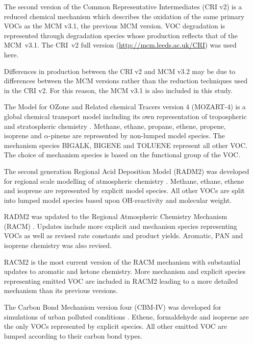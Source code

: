 The second version of the Common Representative Intermediates (CRI v2) \citep{Jenkin:2008} is a reduced chemical mechanism which describes the oxidation of the same primary VOCs as the MCM v3.1, the previous MCM version. 
VOC degradation is represented through degradation species whose  production reflects that of the \mbox{MCM v3.1}. 
The \mbox{CRI v2} full version (\url{http://mcm.leeds.ac.uk/CRI}) was used here.

Differences in  production between the CRI v2 and MCM v3.2 may be due to differences between the MCM versions rather than the reduction techniques used in the CRI v2. 
For this reason, the MCM v3.1 is also included in this study.

The Model for OZone and Related chemical Tracers version 4 (MOZART-4) is a global chemical transport model including its own representation of tropospheric and stratospheric chemistry \citep{Emmons:2010}. 
Methane, ethane, propane, ethene, propene, isoprene and $\alpha$-pinene are represented by non-lumped model species. 
The mechanism species BIGALK, BIGENE and TOLUENE represent all other VOC. 
The choice of mechanism species is based on the functional group of the VOC.

The second generation Regional Acid Deposition Model (RADM2) was developed for regional scale modelling of atmospheric chemistry \citep{Stockwell:1990}. 
Methane, ethane, ethene and isoprene are represented by explicit model species. 
All other VOCs are split into lumped model species based upon OH-reactivity and molecular weight.

RADM2 was updated to the Regional Atmospheric Chemistry Mechanism (RACM) \citep{Stockwell:1997}. 
Updates include more explicit and mechanism species representing VOCs as well as revised rate constants and product yields. 
Aromatic, PAN and isoprene chemistry was also revised.

RACM2 is the most current version of the RACM mechanism \citep{Goliff:2013} with substantial updates to aromatic and ketone chemistry. 
More mechanism and explicit species representing emitted VOC are included in RACM2 leading to a more detailed mechanism than its previous versions.

The Carbon Bond Mechanism version four (CBM-IV) was developed for simulations of urban polluted conditions \citep{Gery:1989}. 
Ethene, formaldehyde and isoprene are the only VOCs represented by explicit species. 
All other emitted VOC are lumped according to their carbon bond types. 

